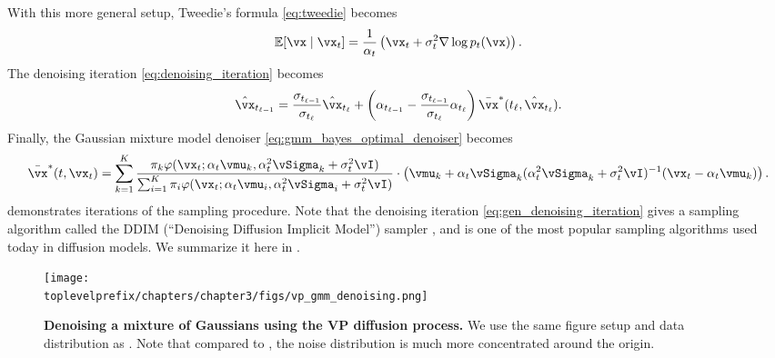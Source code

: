 \documentclass[../../book-main.tex]{subfiles}
\begin{document}
With this more general setup, Tweedie's formula \eqref{eq:tweedie} becomes 
\begin{equation}\label{eq:gen_tweedie}
	\Ex[\vx \mid \vx_{t}] = \frac{1}{\alpha_{t}}\bp{\vx_{t} + \sigma_{t}^{2}\nabla \log p_{t}(\vx)}.
\end{equation}
The denoising iteration \eqref{eq:denoising_iteration} becomes
\begin{equation}\label{eq:gen_denoising_iteration}
	\hat{\vx}_{t_{\ell - 1}} = \frac{\sigma_{t_{\ell - 1}}}{\sigma_{t_{\ell}}}\hat{\vx}_{t_{\ell}} + \bp{\alpha_{t_{\ell - 1}} - \frac{\sigma_{t_{\ell - 1}}}{\sigma_{t_{\ell}}}\alpha_{t_{\ell}}}\bar{\vx}^{\ast}(t_{\ell}, \hat{\vx}_{t_{\ell}}).
\end{equation}
Finally, the Gaussian mixture model denoiser \eqref{eq:gmm_bayes_optimal_denoiser} becomes 
\begin{equation}\label{eq:gen_gmm_bayes_optimal_denoiser}
	\bar{\vx}^{\ast}(t, \vx_{t}) = \sum_{k = 1}^{K}\frac{\pi_{k}\phi(\vx_{t}
	; \alpha_{t}\vmu_{k}, \alpha_{t}^{2}\vSigma_{k}
	+ \sigma_{t}^{2}\vI)}{\sum_{i = 1}^{K}\pi_{i}\phi(\vx_{t} ; \alpha_{t}\vmu_{i}, \alpha_{t}^{2}\vSigma_{i} + \sigma_{t}^{2}\vI)}\cdot\bp{\vmu_{k} + \alpha_{t}\vSigma_{k}(\alpha_{t}^{2}\vSigma_{k} + \sigma_{t}^{2}\vI)^{-1}(\vx_{t} - \alpha_{t}\vmu_{k})}.
\end{equation}
 demonstrates iterations of the sampling procedure. Note that the denoising iteration \eqref{eq:gen_denoising_iteration} gives a sampling algorithm called the DDIM (``Denoising Diffusion Implicit Model'') sampler \cite{song2020denoising}, and is one of the most popular sampling algorithms used today in diffusion models. We summarize it here in .

\begin{figure}
	\centering 
	\texttt{[image: \\toplevelprefix/chapters/chapter3/figs/vp\_gmm\_denoising.png]}
	\caption{\small\textbf{Denoising a mixture of Gaussians using the VP diffusion process.} We use the same figure setup and data distribution as . Note that compared to , the noise distribution is much more concentrated around the origin.}
	\label{fig:vp_gmm_denoising}
\end{figure}
\end{document}
